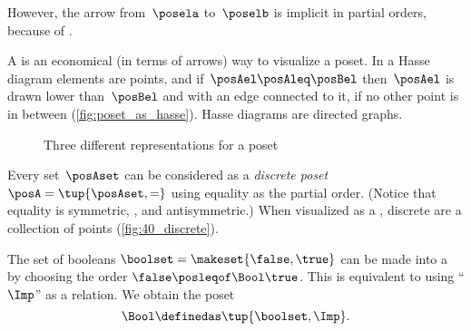 However, the arrow from~$\posela$ to~$\poselb$ is implicit in partial orders, because of .

\label{sec:hasse-diagram}
A  is an economical (in terms of arrows) way to visualize a poset.
In a Hasse diagram elements are points, and if~$\posAel \posAleq \posBel$ then~$\posAel$ is drawn lower than~$\posBel$ and with an edge connected to it, if no other point is in between (\cref{fig:poset_as_hasse}).
Hasse diagrams are directed graphs.

\begin{figure*}[h!]
    \hspace{4em}
    \hspace{4em}
    \hspace{4em}
    \caption{Three different representations for a poset}
    \label{fig:poset_representation}
\end{figure*}

\clearpage
\begin{marginfigure}
    \centering
    \caption{}
    \label{fig:40_discrete}
\end{marginfigure}

\begin{example}

    \label{ex:discreteposet}
    Every set~$\posAset$ can be considered as a \emph{discrete poset}~$\posA = \tup{\posAset,{{=}}}$ using equality as the partial order.
    (Notice that equality is symmetric, , and antisymmetric.)
    When visualized as a , discrete  are a collection of points (\cref{fig:40_discrete}).
\end{example}
\vspace{1cm}
\begin{marginfigure}[4mm]
    \centering
    \caption{}
\end{marginfigure}

\begin{definition}
    \label{def:bool-poset}
    The set of booleans $\boolset = \makeset{\false, \true}$ can be made into a  by choosing the order $\false \posleqof\Bool \true$.
    This is equivalent to using ``$\Imp$'' as a relation.
    We obtain the poset
    \begin{equation}
        \label{eq:bool-poset}
        \Bool \definedas \tup{\boolset, {{\Imp}}}.
    \end{equation}
\end{definition}

